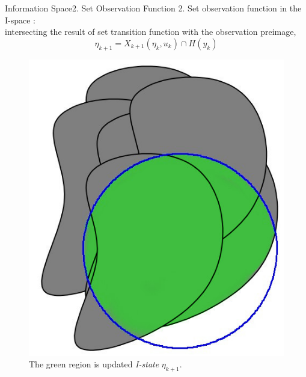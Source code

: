 \begin{frame}{Information Space}{2. Set Observation Function}
  2. Set observation function in the I-space : \\
  intersecting the result of set transition function with the observation preimage,
  \begin{equation}
    \label{eq:settrans}
    \eta_{k+1} =   X_{k+1}(\eta_{k}, u_k) \cap H(y_{k})
  \end{equation}
  
   \begin{figure}
     \centering
     \includegraphics[scale=0.2]{figs/xk_intersect.jpg}
     \caption{\scriptsize{The green region is updated \emph{I-state} $\eta_{k+1}$.}}
   \end{figure}
 \end{frame}




